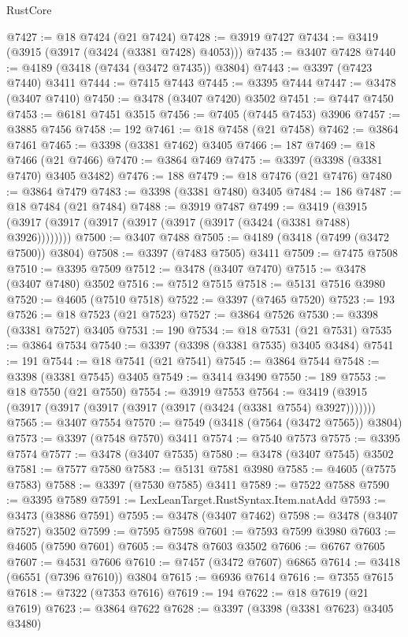 \begin{lexlean}{RustCore}
\begin{coremodule}
@7427 := @18 @7424 (@21 @7424)
@7428 := @3919 @7427
@7434 := @3419 (@3915 (@3917 (@3424 (@3381 @7428) @4053)))
@7435 := @3407 @7428
@7440 := @4189 (@3418 (@7434 (@3472 @7435)) @3804)
@7443 := @3397 (@7423 @7440) @3411
@7444 := @7415 @7443
@7445 := @3395 @7444
@7447 := @3478 (@3407 @7410)
@7450 := @3478 (@3407 @7420) @3502
@7451 := @7447 @7450
@7453 := @6181 @7451 @3515
@7456 := @7405 (@7445 @7453) @3906
@7457 := @3885 @7456
@7458 := 192
@7461 := @18 @7458 (@21 @7458)
@7462 := @3864 @7461
@7465 := @3398 (@3381 @7462) @3405
@7466 := 187
@7469 := @18 @7466 (@21 @7466)
@7470 := @3864 @7469
@7475 := @3397 (@3398 (@3381 @7470) @3405 @3482)
@7476 := 188
@7479 := @18 @7476 (@21 @7476)
@7480 := @3864 @7479
@7483 := @3398 (@3381 @7480) @3405
@7484 := 186
@7487 := @18 @7484 (@21 @7484)
@7488 := @3919 @7487
@7499 := @3419 (@3915 (@3917 (@3917 (@3917 (@3917 (@3917 (@3917 (@3424 (@3381 @7488) @3926))))))))
@7500 := @3407 @7488
@7505 := @4189 (@3418 (@7499 (@3472 @7500)) @3804)
@7508 := @3397 (@7483 @7505) @3411
@7509 := @7475 @7508
@7510 := @3395 @7509
@7512 := @3478 (@3407 @7470)
@7515 := @3478 (@3407 @7480) @3502
@7516 := @7512 @7515
@7518 := @5131 @7516 @3980
@7520 := @4605 (@7510 @7518)
@7522 := @3397 (@7465 @7520)
@7523 := 193
@7526 := @18 @7523 (@21 @7523)
@7527 := @3864 @7526
@7530 := @3398 (@3381 @7527) @3405
@7531 := 190
@7534 := @18 @7531 (@21 @7531)
@7535 := @3864 @7534
@7540 := @3397 (@3398 (@3381 @7535) @3405 @3484)
@7541 := 191
@7544 := @18 @7541 (@21 @7541)
@7545 := @3864 @7544
@7548 := @3398 (@3381 @7545) @3405
@7549 := @3414 @3490
@7550 := 189
@7553 := @18 @7550 (@21 @7550)
@7554 := @3919 @7553
@7564 := @3419 (@3915 (@3917 (@3917 (@3917 (@3917 (@3917 (@3424 (@3381 @7554) @3927)))))))
@7565 := @3407 @7554
@7570 := @7549 (@3418 (@7564 (@3472 @7565)) @3804)
@7573 := @3397 (@7548 @7570) @3411
@7574 := @7540 @7573
@7575 := @3395 @7574
@7577 := @3478 (@3407 @7535)
@7580 := @3478 (@3407 @7545) @3502
@7581 := @7577 @7580
@7583 := @5131 @7581 @3980
@7585 := @4605 (@7575 @7583)
@7588 := @3397 (@7530 @7585) @3411
@7589 := @7522 @7588
@7590 := @3395 @7589
@7591 := LexLeanTarget.RustSyntax.Item.natAdd
@7593 := @3473 (@3886 @7591)
@7595 := @3478 (@3407 @7462)
@7598 := @3478 (@3407 @7527) @3502
@7599 := @7595 @7598
@7601 := @7593 @7599 @3980
@7603 := @4605 (@7590 @7601)
@7605 := @3478 @7603 @3502
@7606 := @6767 @7605
@7607 := @4531 @7606
@7610 := @7457 (@3472 @7607) @6865
@7614 := @3418 (@6551 (@7396 @7610)) @3804
@7615 := @6936 @7614
@7616 := @7355 @7615
@7618 := @7322 (@7353 @7616)
@7619 := 194
@7622 := @18 @7619 (@21 @7619)
@7623 := @3864 @7622
@7628 := @3397 (@3398 (@3381 @7623) @3405 @3480)

\end{coremodule}
\end{lexlean}
